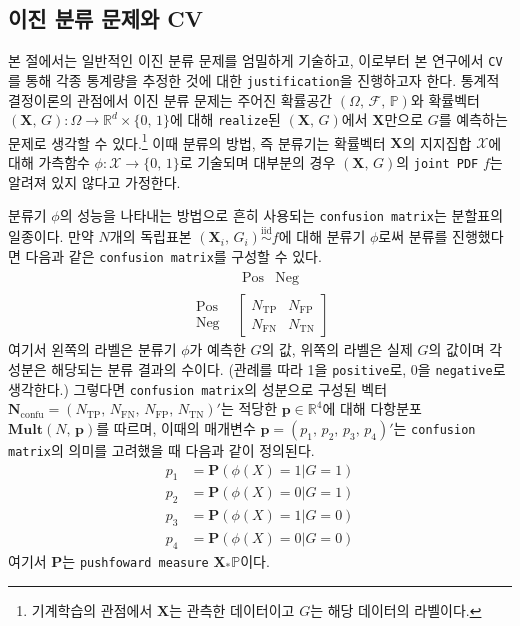 \documentclass[10pt,onecolumn,twoside,a4size]{gsag3jnl}
\newcommand{\iid}{\stackrel{\mathrm{iid}}{\sim}}
\begin{document}
\subsection{이진 분류 문제와 CV}

본 절에서는 일반적인 이진 분류 문제를 엄밀하게 기술하고, 이로부터 본 연구에서 \texttt{CV}를 통해 각종 통계량을 추정한 것에 대한 \texttt{justification}을 진행하고자 한다. 통계적 결정이론의 관점에서 이진 분류 문제는 주어진 확률공간 $(\Omega,\,\mathcal{F},\,\mathbb{P})$와 확률벡터 $(\mathbf{X},\,G):\Omega\to\mathbb{R}^d\times\{0,\,1\}$에 대해 \texttt{realize}된 $(\mathbf{X},\,G)$에서 $\mathbf{X}$만으로 $G$를 예측하는 문제로 생각할 수 있다.\footnote{기계학습의 관점에서 $\mathbf{X}$는 관측한 데이터이고 $G$는 해당 데이터의 라벨이다.} 이때 분류의 방법, 즉 분류기는 확률벡터 $\mathbf{X}$의 지지집합 $\mathcal{X}$에 대해 가측함수 $\phi:\mathcal{X}\to\{0,\,1\}$로 기술되며 대부분의 경우 $(\mathbf{X},\,G)$의 \texttt{joint PDF} $f$는 알려져 있지 않다고 가정한다.

분류기 $\phi$의 성능을 나타내는 방법으로 흔히 사용되는 \texttt{confusion matrix}는 분할표의 일종이다. 만약 $N$개의 독립표본 $(\mathbf{X}_i,\,G_i)\iid f$에 대해 분류기 $\phi$로써 분류를 진행했다면 다음과 같은 \texttt{confusion matrix}를 구성할 수 있다.
\begin{equation}
  \begin{array}{cc}
      &\begin{array}{cc}
          \mathrm{Pos} & \mathrm{Neg}
      \end{array}\\
      \begin{array}{r}
          \mathrm{Pos}\\
          \mathrm{Neg}
      \end{array}&\left[\begin{array}{cc}
          N_\mathrm{TP} & N_\mathrm{FP}\\
          N_\mathrm{FN} & N_\mathrm{TN}
      \end{array}\right]
  \end{array}
\end{equation}
여기서 왼쪽의 라벨은 분류기 $\phi$가 예측한 $G$의 값, 위쪽의 라벨은 실제 $G$의 값이며 각 성분은 해당되는 분류 결과의 수이다. (관례를 따라 1을 \texttt{positive}로, 0을 \texttt{negative}로 생각한다.) 그렇다면 \texttt{confusion matrix}의 성분으로 구성된 벡터 $\mathbf{N}_\mathrm{confu}=(N_\mathrm{TP},\,N_\mathrm{FN},\,N_\mathrm{FP},\,N_\mathrm{TN})'$는 적당한 $\mathbf{p}\in\mathbb{R}^4$에 대해 다항분포 $\mathbf{Mult}(N,\,\mathbf{p})$를 따르며, 이때의 매개변수 $\mathbf{p}=(p_1,\,p_2,\,p_3,\,p_4)'$는 \texttt{confusion matrix}의 의미를 고려했을 때 다음과 같이 정의된다.
\begin{align}
  p_1&=\mathbf{P}(\phi(X)=1\vert G=1)\\
  p_2&=\mathbf{P}(\phi(X)=0\vert G=1)\nonumber\\
  p_3&=\mathbf{P}(\phi(X)=1\vert G=0)\nonumber\\
  p_4&=\mathbf{P}(\phi(X)=0\vert G=0)\nonumber
\end{align}
여기서 $\mathbf{P}$는 \texttt{pushfoward measure} $\mathbf{X}_*\mathbb{P}$이다.
\end{document}
